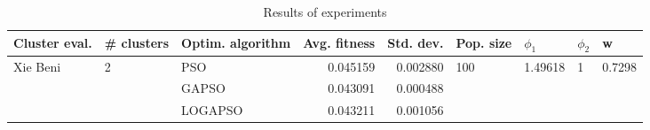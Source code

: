 \begin{table}
\centering
\caption{Results of experiments}
\begin{tabular}{lllrrllll}
\toprule
            Cluster eval. &        \# clusters & Optim. algorithm &  Avg. fitness &  Std. dev. &            Pop. size &               $\phi_{1}$ &         $\phi_{2}$ &                       w \\
\midrule
\multirow{3}{*}{Xie Beni} & \multirow{3}{*}{2} &              PSO &      0.045159 &   0.002880 & \multirow{3}{*}{100} & \multirow{3}{*}{1.49618} & \multirow{3}{*}{1} & \multirow{3}{*}{0.7298} \\
                          &                    &            GAPSO &      0.043091 &   0.000488 &                      &                          &                    &                         \\
                          &                    &          LOGAPSO &      0.043211 &   0.001056 &                      &                          &                    &                         \\
\bottomrule
\end{tabular}
\end{table}
